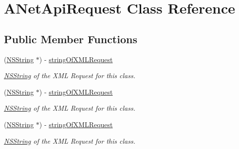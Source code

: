 \hypertarget{interface_a_net_api_request}{
\section{ANetApiRequest Class Reference}
\label{interface_a_net_api_request}
}
\subsection*{Public Member Functions}
\begin{DoxyCompactItemize}
\item 
(\hyperlink{class_n_s_string}{NSString} $\ast$) -\/ \hyperlink{interface_a_net_api_request_a77d7b3eec11910bcf62d678749c18ca3}{stringOfXMLRequest}
\begin{DoxyCompactList}\small\item\em \hyperlink{class_n_s_string}{NSString} of the XML Request for this class. \item\end{DoxyCompactList}\item 
(\hyperlink{class_n_s_string}{NSString} $\ast$) -\/ \hyperlink{interface_a_net_api_request_a77d7b3eec11910bcf62d678749c18ca3}{stringOfXMLRequest}
\begin{DoxyCompactList}\small\item\em \hyperlink{class_n_s_string}{NSString} of the XML Request for this class. \item\end{DoxyCompactList}\item 
(\hyperlink{class_n_s_string}{NSString} $\ast$) -\/ \hyperlink{interface_a_net_api_request_a77d7b3eec11910bcf62d678749c18ca3}{stringOfXMLRequest}
\begin{DoxyCompactList}\small\item\em \hyperlink{class_n_s_string}{NSString} of the XML Request for this class. \item\end{DoxyCompactList}\end{DoxyCompactItemize}
